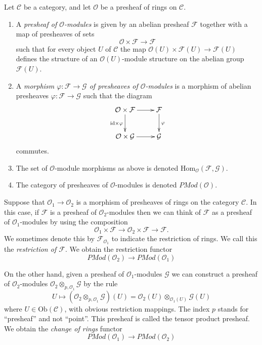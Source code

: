 \begin{definition}
\label{definition-presheaf-modules}
Let $\mathcal{C}$ be a category, and
let $\mathcal{O}$ be a presheaf of rings on $\mathcal{C}$.
\begin{enumerate}
\item A {\it presheaf of $\mathcal{O}$-modules}
is given by an abelian presheaf $\mathcal{F}$ together with a
map of presheaves of sets
$$
\mathcal{O} \times \mathcal{F} \longrightarrow \mathcal{F}
$$
such that for every object $U$ of $\mathcal{C}$ the map
$\mathcal{O}(U) \times \mathcal{F}(U) \to \mathcal{F}(U)$
defines the structure of an $\mathcal{O}(U)$-module
structure on the abelian group $\mathcal{F}(U)$.
\item A {\it morphism $\varphi : \mathcal{F} \to \mathcal{G}$
of presheaves of $\mathcal{O}$-modules} is a morphism of abelian presheaves
$\varphi : \mathcal{F} \to \mathcal{G}$ such that
the diagram
$$
\xymatrix{
\mathcal{O} \times \mathcal{F} \ar[r] \ar[d]_{\text{id}\times \varphi} &
\mathcal{F} \ar[d]^{\varphi} \\
\mathcal{O} \times \mathcal{G} \ar[r] &
\mathcal{G}
}
$$
commutes.
\item The set of $\mathcal{O}$-module morphisms as above is
denoted $\text{Hom}_{\mathcal{O}}(\mathcal{F}, \mathcal{G})$.
\item The category of presheaves of $\mathcal{O}$-modules is denoted
$\textit{PMod}(\mathcal{O})$.
\end{enumerate}
\end{definition}

\noindent
Suppose that $\mathcal{O}_1 \to \mathcal{O}_2$ is a
morphism of presheaves of rings on the category $\mathcal{C}$. In this case,
if $\mathcal{F}$ is a presheaf of $\mathcal{O}_2$-modules
then we can think of $\mathcal{F}$ as a presheaf of
$\mathcal{O}_1$-modules by using the composition
$$
\mathcal{O}_1 \times \mathcal{F}
\to
\mathcal{O}_2 \times \mathcal{F}
\to
\mathcal{F}.
$$
We sometimes denote this by $\mathcal{F}_{\mathcal{O}_1}$
to indicate the restriction of rings. We call this
the {\it restriction of $\mathcal{F}$}. We obtain the
restriction functor
$$
\textit{PMod}(\mathcal{O}_2)
\longrightarrow
\textit{PMod}(\mathcal{O}_1)
$$

\medskip\noindent
On the other hand, given a presheaf of $\mathcal{O}_1$-modules
$\mathcal{G}$
we can construct a presheaf of $\mathcal{O}_2$-modules
$\mathcal{O}_2 \otimes_{p, \mathcal{O}_1} \mathcal{G}$
by the rule
$$
U \longmapsto
\left(\mathcal{O}_2 \otimes_{p, \mathcal{O}_1} \mathcal{G}\right)(U)
=
\mathcal{O}_2(U) \otimes_{\mathcal{O}_1(U)} \mathcal{G}(U)
$$
where $U \in \text{Ob}(\mathcal{C})$, with obvious restriction mappings.
The index $p$ stands for ``presheaf'' and not ``point''.
This presheaf is called the tensor product presheaf. We obtain
the {\it change of rings} functor
$$
\textit{PMod}(\mathcal{O}_1)
\longrightarrow
\textit{PMod}(\mathcal{O}_2)
$$

